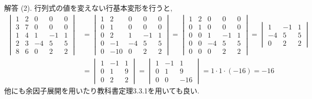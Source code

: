 \documentclass[dvipdfmx,a4paper,11pt]{article} %
\theoremstyle{definition}
\begin{document}
\begin{enumerate}[label=\textbf{問題}\arabic*.]
解答 (2).
行列式の値を変えない行基本変形を行うと,
\[
\begin{aligned}
\begin{vmatrix}
1&2&0&0&0\\
3&7&0&0&0\\
1&4&1&-1&1\\
2&3&-4&5&5\\
8&6&0&2&2
\end{vmatrix}
&=
\begin{vmatrix}
1&2&0&0&0\\
0&1&0&0&0\\
0&2&1&-1&1\\
0&-1&-4&5&5\\
0&-10&0&2&2
\end{vmatrix}
=
\begin{vmatrix}
1&2&0&0&0\\
0&1&0&0&0\\
0&0&1&-1&1\\
0&0&-4&5&5\\
0&0&0&2&2
\end{vmatrix}
=
\begin{vmatrix}
1&-1&1\\
-4&5&5\\
0&2&2
\end{vmatrix}\\
&=
\begin{vmatrix}
1&-1&1\\
0&1&9\\
0&2&2
\end{vmatrix}
=
\begin{vmatrix}
1&-1&1\\
0&1&9\\
0&0&-16
\end{vmatrix}
=
1\cdot 1\cdot(-16)
=-16
\end{aligned}
\]
他にも余因子展開を用いたり教科書定理3.3.1を用いても良い. 


\end{enumerate}
\end{document}
